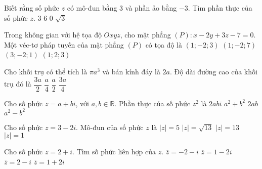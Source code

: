 	\begin{ex}%
		Biết rằng số phức $z$ có mô-đun bằng $3$ và phần ảo bằng $-3$. Tìm phần thực của số phức $z$.		
		\choice
		{$3$}
		{$6$}
		{\True $0$}
		{$\sqrt{3}$}
	\end{ex}
	\begin{ex}%
		Trong không gian với hệ tọa độ $Oxyz$, cho mặt phẳng $(P)\colon  x-2y+3z-7=0$. Một véc-tơ pháp tuyến của mặt phẳng $(P)$ có tọa độ là		
		\choice
		{\True $(1;-2;3)$}
		{$(1;-2;7)$}
		{$(3;-2;1)$}
		{$(1;2;3)$}
	\end{ex}
	\begin{ex}%
		Cho khối trụ  có thể tích là $\pi a^3$ và bán kính đáy là $2a$. Độ dài đường cao của khối trụ đó là 
		\choice
		{$\dfrac{3a}{2}$}
		{$\dfrac{a}{4}$}
		{\True $\dfrac{a}{2}$}
		{$\dfrac{3a}{4}$}
	\end{ex}
	\begin{ex}%
		Cho số phức $z=a+bi$, với $a,b \in \mathbb{R}$. Phần thực của số phức $z^2$ là		
		\choice
		{$2abi$}
		{$a^2+b^2$}
		{$2ab$}
		{\True $a^2-b^2$}
	\end{ex}
	\begin{ex}%
		Cho số phức $z=3-2i$. Mô-đun của số phức $z$ là		
		\choice
		{$|z|=5$}
		{\True $|z|=\sqrt{13}$}
		{$|z|=13$}
		{$|z|=1$}
	\end{ex}
	\begin{ex}%
		Cho số phức $z=2+i$. Tìm số phức liên hợp của $z$.		
		\choice
		{$\overline{z}=-2-i$}
		{$\overline{z}=1-2i$}
		{\True $\overline{z}=2-i$}
		{$\overline{z}=1+2i$}	
	\end{ex}
